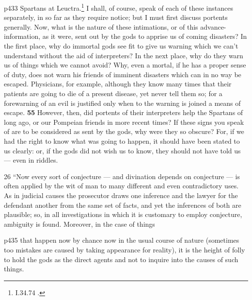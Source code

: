 p433 Spartans at Leuctra.\texthebrew{}\footnote{I.34.74 .

} I shall, of course, speak of each of these instances separately, in so far as they require notice; but I must first discuss portents generally. Now, what is the nature of these intimations, or of this advance-information, as it were, sent out by the gods to apprise us of coming disasters? In the first place, why do immortal gods see fit to give us warning which we can't understand without the aid of interpreters? In the next place, why do they warn us of things which we cannot avoid? Why, even a mortal, if he has a proper sense of duty, does not warn his friends of imminent disasters which can in no way be escaped. Physicians, for example, although they know many times that their patients are going to die of a present disease, yet never tell them so; for a forewarning of an evil is justified only when to the warning is joined a means of escape. \textbf{55} However, then, did portents of their interpreters help the Spartans of long ago, or our Pompeian friends in more recent times? If these signs you speak of are to be considered as sent by the gods, why were they so obscure? For, if we had the right to know what was going to happen, it should have been stated to us clearly: or, if the gods did not wish us to know, they should not have told us \texthebrew{—} even in riddles.

26
``Now every sort of conjecture \texthebrew{—} and divination depends on conjecture \texthebrew{—} is often applied by the wit of man to many different and even contradictory uses. As in judicial causes the prosecutor draws one inference and the lawyer for the defendant another from the same set of facts, and yet the inferences of both are plausible; so, in all investigations in which it is customary to employ conjecture, ambiguity is found. Moreover, in the case of things

p435 that happen now by chance now in the usual course of nature (sometimes too mistakes are caused by taking appearance for reality), it is the height of folly to hold the gods as the direct agents and not to inquire into the causes of such things.

